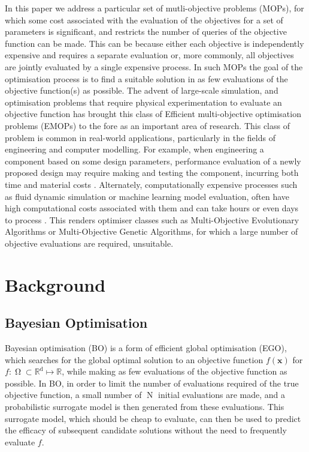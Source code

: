 \documentclass[conference]{IEEEtran}
\DeclareMathOperator*{\ninitialevaluations}{N}
\DeclareMathOperator*{\parameterspace}{\Omega}
\DeclareMathOperator*{\ndim}{d}
\begin{document}
In this paper we address a particular set of mutli-objective problems (MOPs), for which some cost associated with the evaluation of the objectives for a set of parameters is significant, and restricts the number of queries of the objective function can be made. This can be because either each objective is independently expensive and requires a separate evaluation or, more commonly, all objectives are jointly evaluated by a single expensive process. In such MOPs the goal of the optimisation process is to find a suitable solution in as few evaluations of the objective function(s) as possible. The advent of large-scale simulation, and optimisation problems that require physical experimentation to evaluate an objective function has brought this class of Efficient multi-objective optimisation problems (EMOPs) to the fore as an important area of research. This class of problem is common in real-world applications, particularly in the fields of engineering and computer modelling. For example, when engineering a component based on some design parameters, performance evaluation of a newly proposed design may require making and testing the component, incurring both time and material costs \cite{fang2017design}. Alternately, computationally expensive processes such as fluid dynamic simulation or machine learning model evaluation, often have high computational costs associated with them and can take hours or even days to process \cite{huband2005scalable}. This renders optimiser classes such as Multi-Objective Evolutionary Algorithms\cite{tanabe2017benchmarking,coello2007evolutionary} or Multi-Objective Genetic Algorithms\cite{tamaki1996multi}, for which a large number of objective evaluations are required, unsuitable. 

\section{Background}
\subsection{Bayesian Optimisation}\label{section:background_BayesianOptimisation}
Bayesian optimisation (BO) is a form of efficient global optimisation (EGO), which searches for the global optimal solution to an objective function $f(\mathbf{x})$ for  $f: \parameterspace \subset \mathbb{R}^{\ndim} \mapsto \mathbb{R}$, while making as few evaluations of the objective function as possible. In BO, in order to limit the number of evaluations required of the true objective function,  a small number of $\ninitialevaluations$ initial evaluations are made, and a probabilistic surrogate model is then generated from these evaluations. This surrogate model, which should be cheap to evaluate, can then be used to predict the efficacy of subsequent candidate solutions without the need to frequently evaluate $f$. 
\end{document}
